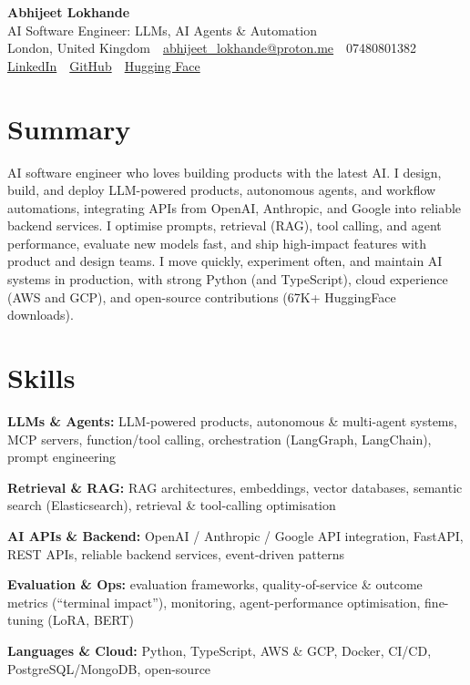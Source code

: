 \documentclass[10pt,a4paper]{article}
\newcommand{\sep}{\,\textcolor{accent!60}{\textbar}\,}
\begin{document}
\begin{center}
  {\fontsize{24}{26}\selectfont\bfseries Abhijeet Lokhande}\\[3pt]
  {\color{accent}\large AI Software Engineer: LLMs, AI Agents \& Automation}\\[5pt]
  {\small
    London, United Kingdom \sep
    \href{mailto:abhijeet_lokhande@proton.me}{abhijeet\_lokhande@proton.me} \sep
    07480801382 \\[2pt]
    \href{https://www.linkedin.com/in/ablds/}{LinkedIn} \sep
    \href{https://github.com/abhijeetscode}{GitHub} \sep
    \href{https://huggingface.co/ab-ai}{Hugging Face}
  }
\end{center}
\vspace{2pt}

\section{Summary}
AI software engineer who loves building products with the latest AI. I design, build, and deploy LLM-powered products, autonomous agents, and workflow automations, integrating APIs from OpenAI, Anthropic, and Google into reliable backend services. I optimise prompts, retrieval (RAG), tool calling, and agent performance, evaluate new models fast, and ship high-impact features with product and design teams. I move quickly, experiment often, and maintain AI systems in production, with strong Python (and TypeScript), cloud experience (AWS and GCP), and open-source contributions (67K+ HuggingFace downloads).

\section{Skills}
\begin{tight}
  \item[\textcolor{accent}{\small$\bullet$}] \textbf{LLMs \& Agents:} LLM-powered products, autonomous \& multi-agent systems, MCP servers, function/tool calling, orchestration (LangGraph, LangChain), prompt engineering
  \item[\textcolor{accent}{\small$\bullet$}] \textbf{Retrieval \& RAG:} RAG architectures, embeddings, vector databases, semantic search (Elasticsearch), retrieval \& tool-calling optimisation
  \item[\textcolor{accent}{\small$\bullet$}] \textbf{AI APIs \& Backend:} OpenAI / Anthropic / Google API integration, FastAPI, REST APIs, reliable backend services, event-driven patterns
  \item[\textcolor{accent}{\small$\bullet$}] \textbf{Evaluation \& Ops:} evaluation frameworks, quality-of-service \& outcome metrics (``terminal impact''), monitoring, agent-performance optimisation, fine-tuning (LoRA, BERT)
  \item[\textcolor{accent}{\small$\bullet$}] \textbf{Languages \& Cloud:} Python, TypeScript, AWS \& GCP, Docker, CI/CD, PostgreSQL/MongoDB, open-source
\end{tight}
\end{document}

